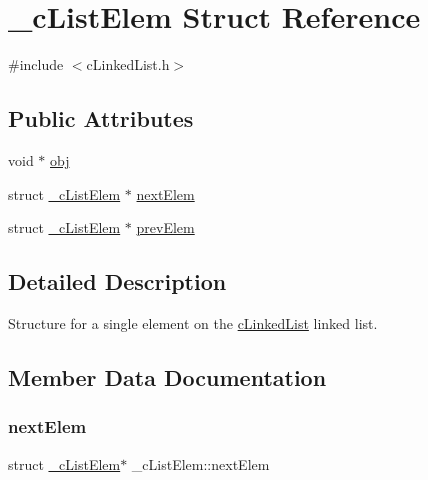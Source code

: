 \hypertarget{struct__c_list_elem}{}\section{\+\_\+c\+List\+Elem Struct Reference}
\label{struct__c_list_elem}


{\ttfamily \#include $<$c\+Linked\+List.\+h$>$}

\subsection*{Public Attributes}
\begin{DoxyCompactItemize}
\item 
void $\ast$ \mbox{\hyperlink{struct__c_list_elem_a34335ca0c0d6f4569bed193029cd54b5}{obj}}
\item 
struct \mbox{\hyperlink{struct__c_list_elem}{\+\_\+c\+List\+Elem}} $\ast$ \mbox{\hyperlink{struct__c_list_elem_ab60a1d40eb0ed3374ce954d7a1adb0a0}{next\+Elem}}
\item 
struct \mbox{\hyperlink{struct__c_list_elem}{\+\_\+c\+List\+Elem}} $\ast$ \mbox{\hyperlink{struct__c_list_elem_a15b50cfddde4733d3f14c2db4be0a993}{prev\+Elem}}
\end{DoxyCompactItemize}


\subsection{Detailed Description}
Structure for a single element on the \mbox{\hyperlink{c_linked_list_8h_aac1ab3387f7254e06b22dc5a54f2e5f6}{c\+Linked\+List}} linked list. 

\subsection{Member Data Documentation}
\mbox{\label{struct__c_list_elem_ab60a1d40eb0ed3374ce954d7a1adb0a0}} 
\subsubsection{\texorpdfstring{next\+Elem}{nextElem}}
{\footnotesize\ttfamily struct \mbox{\hyperlink{struct__c_list_elem}{\+\_\+c\+List\+Elem}}$\ast$ \+\_\+c\+List\+Elem\+::next\+Elem}

